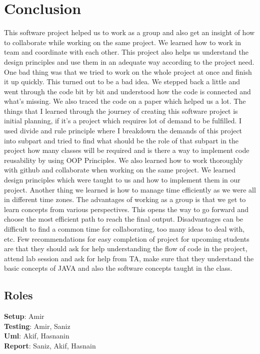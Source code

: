 \documentclass[12pt, dvipsnames, a4paper]{article}
\begin{document}
\section{Conclusion}
This software project helped us to work as a group and also get an insight of how to collaborate while working on the same project.
We learned how to work in team and coordinate with each other. This project also helps us understand the design principles and use
them in an adequate way according to the project need. One bad thing was that we tried to work on the whole project at once and finish
it up quickly. This turned out to be a bad idea. We stepped back a little and went through the code bit by bit and understood how the
code is connected and what’s missing. We also traced the code on a paper which helped us a lot. The things that I learned through the
journey of creating this software project is initial planning, if it’s a project which requires lot of demand to be fulfilled. I used
divide and rule principle where I breakdown the demands of this project into subpart and tried to find what should be the role of that
subpart in the project how many classes will be required and is there a way to implement code reusability by using OOP Principles. We also
learned how to work thoroughly with github and collaborate when working on the same project. We learned design principles which were taught
to us and how to implement them in our project. Another thing we learned is how to manage time efficiently as we were all in different time zones.
The advantages of working as a group is that we get to learn concepts from various perspectives. This opens the way to go forward and choose the
most efficient path to reach the final output. Disadvantages can be difficult to find a common time for collaborating, too many ideas to deal with, etc.
Few recommendations for easy completion of project for upcoming students are that they should ask for help understanding the flow of code
in the project, attend lab session and ask for help from TA, make sure that they understand the basic concepts of JAVA and also the software
concepts taught in the class.

\subsection{Roles}
\textbf{Setup}: Amir\\
\textbf{Testing}: Amir, Saniz\\
\textbf{Uml}: Akif, Hasnanin\\
\textbf{Report}: Saniz, Akif, Hasnain\\
\end{document}
